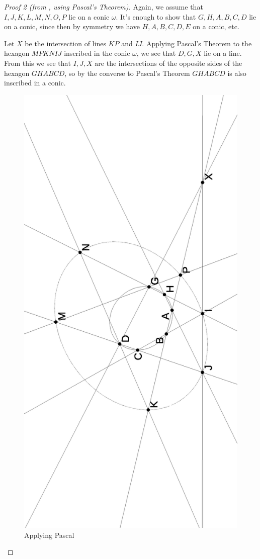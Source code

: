 \documentclass[letterpaper,11pt]{article}
\theoremstyle{definition}
\theoremstyle{remark}
\begin{document}
\begin{proof}[Proof 2 (from \cite{mystic}, using Pascal's Theorem)] Again, we assume that $I,J,K,L,M,N,O,P$ lie on a conic $\omega$. It's enough to show that $G,H,A,B,C,D$ lie on a conic, since then by symmetry we have $H,A,B,C,D,E$ on a conic, etc.

Let $X$ be the intersection of lines $KP$ and $IJ$. Applying Pascal's Theorem to the hexagon $MPKNIJ$ inscribed in the conic $\omega$, we see that $D, G, X$ lie on a line. From this we see that $I, J, X$ are the intersections of the opposite sides of the hexagon $GHABCD$, so by the converse to Pascal's Theorem $GHABCD$ is also inscribed in a conic.
\begin{figure}[!htb]
\centering
\includegraphics[scale=0.5,angle=270]{octa2.eps}
\caption{Applying Pascal}\label{octa2}
\end{figure}
\end{proof}
\end{document}
